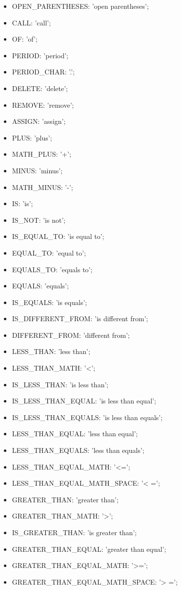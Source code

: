 \begin{itemize}
	\item OPEN\_PARENTHESES: 'open parentheses';
	\item CALL: 'call';
	\item OF: 'of';
	\item PERIOD: 'period';
	\item PERIOD\_CHAR: '.';
	\item DELETE: 'delete';
	\item REMOVE: 'remove';
	\item ASSIGN: 'assign';
	\item PLUS: 'plus';
	\item MATH\_PLUS: '+';
	\item MINUS: 'minus';
	\item MATH\_MINUS: '-';
	\item IS: 'is';
	\item IS\_NOT: 'is not';
	\item IS\_EQUAL\_TO: 'is equal to';
	\item EQUAL\_TO: 'equal to';
	\item EQUALS\_TO: 'equals to';
	\item EQUALS: 'equals';
	\item IS\_EQUALS: 'is equals';
	\item IS\_DIFFERENT\_FROM: 'is different from';
	\item DIFFERENT\_FROM: 'different from';
	\item LESS\_THAN: 'less than';
	\item LESS\_THAN\_MATH: '<';
	\item IS\_LESS\_THAN: 'is less than';
	\item IS\_LESS\_THAN\_EQUAL: 'is less than equal';
	\item IS\_LESS\_THAN\_EQUALS: 'is less than equals';
	\item LESS\_THAN\_EQUAL: 'less than equal';
	\item LESS\_THAN\_EQUALS: 'less than equals';
	\item LESS\_THAN\_EQUAL\_MATH: '<=';
	\item LESS\_THAN\_EQUAL\_MATH\_SPACE: '< =';
	\item GREATER\_THAN: 'greater than';
	\item GREATER\_THAN\_MATH: '>';
	\item IS\_GREATER\_THAN: 'is greater than';
	\item GREATER\_THAN\_EQUAL: 'greater than equal';
	\item GREATER\_THAN\_EQUAL\_MATH: '>=';
	\item GREATER\_THAN\_EQUAL\_MATH\_SPACE: '> =';

\end{itemize}
